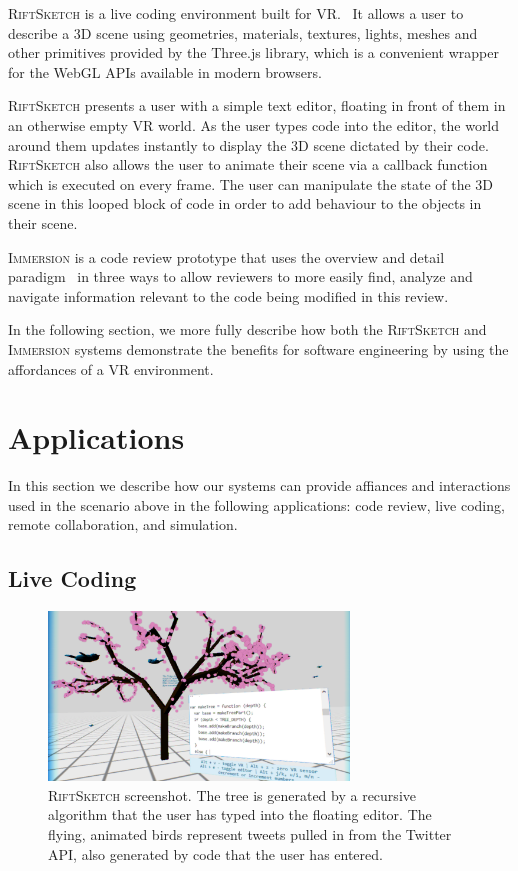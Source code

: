 \documentclass[conference]{IEEEtran}
\begin{document}
\textsc{RiftSketch} is a live coding environment built for VR.~\cite{Peiris:RiftSketchVideo}
It allows a user to describe a 3D scene using geometries, materials, textures, lights, meshes and other primitives provided by the Three.js library, which is a convenient wrapper for the WebGL APIs available in modern browsers. 

\textsc{RiftSketch} presents a user with a simple text editor, floating in front of them in an otherwise empty VR world. 
As the user types code into the editor, the world around them updates instantly to display the 3D scene dictated by their code. 
\textsc{RiftSketch} also allows the user to animate their scene via a callback function which is executed on every frame. 
The user can manipulate the state of the 3D scene in this looped block of code in order to add behaviour to the objects in their scene.

\textsc{Immersion} is a code review prototype that uses the overview and detail paradigm~\cite{Shneiderman:InfoVisTaxonomy} in three ways to allow reviewers to more easily find, analyze and navigate information relevant to the code being modified in this review.

In the following section, we more fully describe how both the \textsc{RiftSketch} and \textsc{Immersion} systems demonstrate the benefits for software engineering by using the affordances of a VR environment.

\section{Applications}

In this section we describe how our systems can provide affiances and interactions used in the scenario above in the following applications:
code review, live coding, remote collaboration, and simulation. 


\subsection{Live Coding}

\begin{figure}[ht!]
\centering
\includegraphics[width=80mm]{figures/riftsketch/closer}
\caption{\textsc{RiftSketch} screenshot. The tree is generated by a recursive algorithm that the user has typed into the floating editor. The flying, animated birds represent tweets pulled in from the Twitter API, also generated by code that the user has entered. \label{RiftSketch}}
\end{figure}
\end{document}

